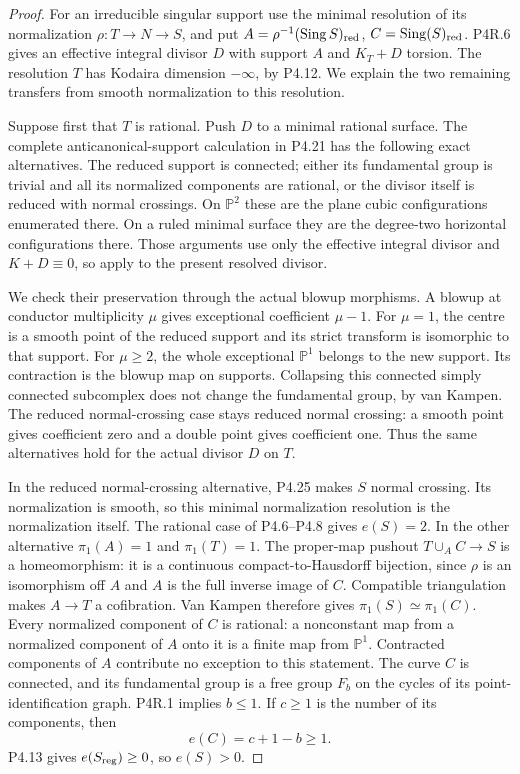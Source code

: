 \begin{proof}
For an irreducible singular support use the
minimal resolution of its normalization
$\rho:T\to N\to S$, and put
$A=\rho^{-1}(\operatorname{Sing}S)_{\rm red}$,
$C=\operatorname{Sing}(S)_{\rm red}$.
P4R.6 gives an effective integral divisor
$D$ with support $A$ and $K_T+D$ torsion.
The resolution $T$ has Kodaira dimension
$-\infty$, by P4.12. We explain the two
remaining transfers from smooth
normalization to this resolution.

Suppose first that $T$ is rational.
Push $D$ to a minimal rational surface.
The complete anticanonical-support calculation
in P4.21 has the following exact alternatives.
The reduced support is connected; either
its fundamental group is trivial and all
its normalized components are rational,
or the divisor itself is reduced with
normal crossings. On $\mathbb P^2$ these
are the plane cubic configurations
enumerated there. On a ruled minimal
surface they are the degree-two horizontal
configurations there. Those arguments use
only the effective integral divisor and
$K+D\equiv0$, so apply to the present
resolved divisor.

We check their preservation through the
actual blowup morphisms. A blowup at
conductor multiplicity $\mu$ gives
exceptional coefficient $\mu-1$.
For $\mu=1$, the centre is a smooth
point of the reduced support and its
strict transform is isomorphic to that
support. For $\mu\ge2$, the whole
exceptional $\mathbb P^1$ belongs to
the new support. Its contraction is
the blowup map on supports. Collapsing
this connected simply connected
subcomplex does not change the
fundamental group, by van Kampen.
The reduced normal-crossing case stays
reduced normal crossing: a smooth
point gives coefficient zero and a
double point gives coefficient one.
Thus the same alternatives hold for
the actual divisor $D$ on $T$.

In the reduced normal-crossing alternative,
P4.25 makes $S$ normal crossing. Its
normalization is smooth, so this minimal
normalization resolution is the
normalization itself. The rational case
of P4.6--P4.8 gives $e(S)=2$.
In the other alternative $\pi_1(A)=1$
and $\pi_1(T)=1$. The proper-map pushout
$T\cup_A C\to S$ is a homeomorphism:
it is a continuous compact-to-Hausdorff
bijection, since $\rho$ is an isomorphism
off $A$ and $A$ is the full inverse
image of $C$. Compatible triangulation
makes $A\to T$ a cofibration.
Van Kampen therefore gives
$\pi_1(S)\simeq\pi_1(C)$.
Every normalized component of $C$ is
rational: a nonconstant map from a
normalized component of $A$ onto it
is a finite map from $\mathbb P^1$.
Contracted components of $A$ contribute
no exception to this statement.
The curve $C$ is connected, and its
fundamental group is a free group
$F_b$ on the cycles of its
point-identification graph. P4R.1
implies $b\le1$. If $c\ge1$ is the
number of its components, then
\[
 e(C)=c+1-b\ge1.
\]
P4.13 gives $e(S_{\rm reg})\ge0$,
so $e(S)>0$.


\end{proof}
